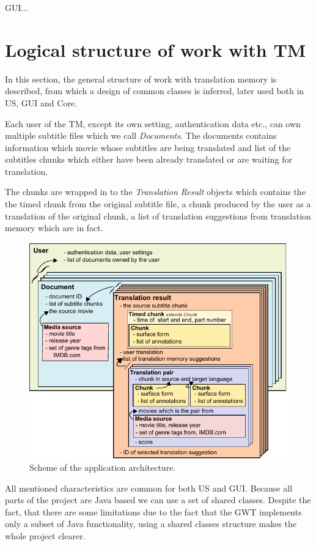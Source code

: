 GUI...

\section{Logical structure of work with TM}

In this section, the general structure of work with translation memory is described, from which a design of common classes is inferred, later used both in US, GUI and Core.

Each user of the TM, except its own setting, authentication data etc., can own multiple subtitle files which we call \emph{Documents}. The documents contains information which movie whose subtitles are being translated and list of the subtitles chunks which either have been already translated or are waiting for translation.

The chunks are wrapped in to the \emph{Translation Result} objects which contains the the timed chunk from the original subtitle file, a chunk produced by the user as a translation of the original chunk, a list of translation suggestions from translation memory which are in fact.

\begin{figure}[h]
\begin{center}
\includegraphics{figures/shared_classes.pdf}
\end{center}
\caption{Scheme of the application architecture.}\label{projectStructure:logical}
\end{figure}

All mentioned characteristics are common for both US and GUI. Because all parts of the project are Java based we can use a set of shared classes. Despite the fact, that there are some limitations due to the fact that the GWT implements only a subset of Java functionality, using a shared classes structure makes the whole project clearer. 

